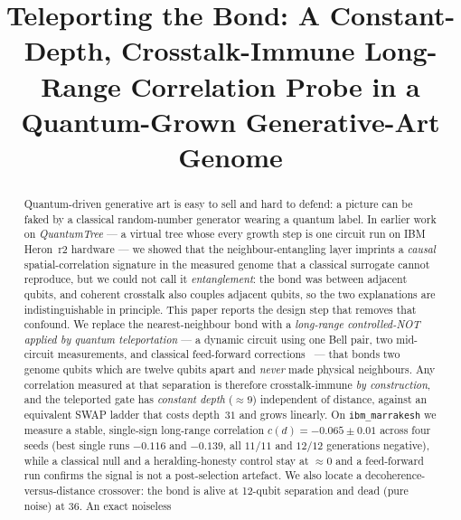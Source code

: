 \documentclass[conference]{IEEEtran}
\begin{document}
\title{Teleporting the Bond: A Constant-Depth, Crosstalk-Immune
Long-Range Correlation Probe in a Quantum-Grown Generative-Art Genome}

\author{
}

\maketitle

\begin{abstract}
Quantum-driven generative art is easy to sell and hard to defend: a picture can be
faked by a classical random-number generator wearing a quantum label. In earlier work
on \emph{QuantumTree} --- a virtual tree whose every growth step is one circuit run on
IBM Heron~r2 hardware --- we showed that the neighbour-entangling layer imprints a
\emph{causal} spatial-correlation signature in the measured genome that a classical
surrogate cannot reproduce, but we could not call it \emph{entanglement}: the bond was
between adjacent qubits, and coherent crosstalk also couples adjacent qubits, so the two
explanations are indistinguishable in principle. This paper reports the design step that
removes that confound. We replace the nearest-neighbour bond with a \emph{long-range
controlled-NOT applied by quantum teleportation} --- a dynamic circuit using one Bell
pair, two mid-circuit measurements, and classical feed-forward
corrections~\cite{gottesman1999,nielsen2010} --- that bonds two genome qubits which are
twelve qubits apart and \emph{never} made physical neighbours. Any correlation measured
at that separation is therefore crosstalk-immune \emph{by construction}, and the
teleported gate has \emph{constant depth} (${\approx}9$) independent of distance, against
an equivalent SWAP ladder that costs depth~$31$ and grows linearly. On
\texttt{ibm\_marrakesh} we measure a stable, single-sign long-range correlation
$c(d){=}-0.065\pm0.01$ across four seeds (best single runs $-0.116$ and $-0.139$, all
$11/11$ and $12/12$ generations negative), while a classical null and a
heralding-honesty control stay at ${\approx}0$ and a feed-forward run confirms the signal
is not a post-selection artefact. We also locate a decoherence-versus-distance crossover:
the bond is alive at 12-qubit separation and dead (pure noise) at 36. An exact noiseless

\end{abstract}
\end{document}
